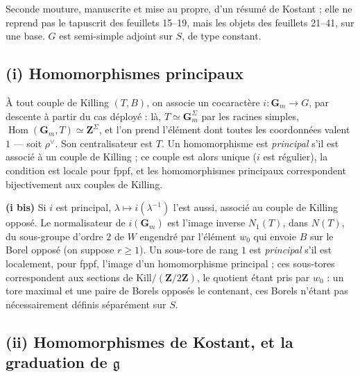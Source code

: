 \documentclass[11pt,a4paper]{article}
\begin{document}
Seconde mouture, manuscrite et mise au propre, d'un résumé de Kostant ; elle ne
reprend pas le tapuscrit des feuillets 15--19, mais les objets des
feuillets 21--41, sur une base. $G$ est semi-simple adjoint sur $S$, de type
constant.

\subsection*{(i) Homomorphismes principaux}

À tout couple de Killing $(T,B)$, on associe un cocaractère
$i\colon\mathbf{G}_{m}\to G$, par descente à partir du cas déployé : là,
$T\simeq\mathbf{G}_{m}^{\Sigma}$ par les racines simples,
$\operatorname{Hom}(\mathbf{G}_{m},T)\simeq\mathbf{Z}^{\Sigma}$, et l'on prend
l'élément dont toutes les coordonnées valent $1$ — soit $\rho^{\vee}$. Son
centralisateur est $T$. Un homomorphisme est \emph{principal} s'il est associé
à un couple de Killing ; ce couple est alors unique ($i$ est régulier), la
condition est locale pour fppf, et les homomorphismes principaux
correspondent bijectivement aux couples de Killing.

\textbf{(i bis)} Si $i$ est principal, $\lambda\mapsto i(\lambda^{-1})$ l'est
aussi, associé au couple de Killing opposé. Le normalisateur de
$i(\mathbf{G}_{m})$ est l'image inverse $N_{1}(T)$, dans $N(T)$, du sous-groupe
d'ordre $2$ de $W$ engendré par l'élément $w_{0}$ qui envoie $B$ sur le Borel
opposé (on suppose $r\geqslant 1$). Un sous-tore de rang $1$ est
\emph{principal} s'il est localement, pour fppf, l'image d'un homomorphisme
principal ; ces sous-tores correspondent aux sections de
$\mathrm{Kill}/(\mathbf{Z}/2\mathbf{Z})$, le quotient étant pris par $w_{0}$ :
un tore maximal et une paire de Borels opposés le contenant, ces Borels
n'étant pas nécessairement définis séparément sur $S$.

\subsection*{(ii) Homomorphismes de Kostant, et la graduation de $\mathfrak{g}$}
\end{document}

